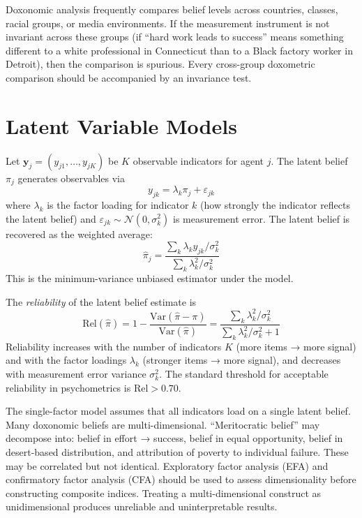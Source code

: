 \begin{remark}
\label{rem:invariance-matters}
Doxonomic analysis frequently compares belief levels across countries, classes, racial groups, or media environments.
If the measurement instrument is not invariant across these groups (if ``hard work leads to success'' means something different to a white professional in Connecticut than to a Black factory worker in Detroit), then the comparison is spurious.
Every cross-group doxometric comparison should be accompanied by an invariance test.
\end{remark}


\section{Latent Variable Models}
\label{sec:ch13-latent}

\begin{model}
\label{mod:factor}
Let $\bm{y}_j = (y_{j1}, \ldots, y_{jK})$ be $K$ observable indicators for agent $j$.
The latent belief $\pi_j$ generates observables via
\[
  y_{jk} = \lambda_k \pi_j + \varepsilon_{jk}
\]
where $\lambda_k$ is the factor loading for indicator $k$ (how strongly the indicator reflects the latent belief) and $\varepsilon_{jk} \sim \mathcal{N}(0, \sigma_k^2)$ is measurement error.
The latent belief is recovered as the weighted average:
\[
  \hat{\pi}_j = \frac{\sum_k \lambda_k y_{jk} / \sigma_k^2}{\sum_k \lambda_k^2 / \sigma_k^2}
\]
This is the minimum-variance unbiased estimator under the model.
\end{model}

\begin{proposition}[Reliability]
\label{prop:reliability}
The \emph{reliability} of the latent belief estimate is
\[
  \text{Rel}(\hat{\pi}) = 1 - \frac{\mathrm{Var}(\hat{\pi} - \pi)}{\mathrm{Var}(\hat{\pi})} = \frac{\sum_k \lambda_k^2 / \sigma_k^2}{\sum_k \lambda_k^2 / \sigma_k^2 + 1}
\]
Reliability increases with the number of indicators $K$ (more items → more signal) and with the factor loadings $\lambda_k$ (stronger items → more signal), and decreases with measurement error variance $\sigma_k^2$.
The standard threshold for acceptable reliability in psychometrics is $\text{Rel} > 0.70$.
\end{proposition}

\begin{remark}
\label{rem:multi-factor}
The single-factor model assumes that all indicators load on a single latent belief.
Many doxonomic beliefs are multi-dimensional.
``Meritocratic belief'' may decompose into: belief in effort → success, belief in equal opportunity, belief in desert-based distribution, and attribution of poverty to individual failure.
These may be correlated but not identical.
Exploratory factor analysis (EFA) and confirmatory factor analysis (CFA) should be used to assess dimensionality before constructing composite indices.
Treating a multi-dimensional construct as unidimensional produces unreliable and uninterpretable results.
\end{remark}

